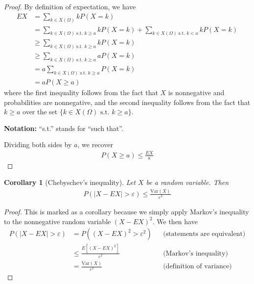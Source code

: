 \documentclass[11pt,letterpaper]{article}
\newcommand\eps{\varepsilon}
\newcommand\var{\text{Var}}
\numberwithin{theorem}{section}
\numberwithin{definition}{section}
\numberwithin{lemma}{section}
\newtheorem{corollary}[theorem]{Corollary}
\numberwithin{corollary}{section}
\numberwithin{proposition}{section}
\theoremstyle{definition}
\numberwithin{remark}{section}
\numberwithin{claim}{section}
\numberwithin{observation}{section}
\numberwithin{fact}{section}
\numberwithin{assumption}{section}
\numberwithin{example}{section}
\numberwithin{exercise}{section}
\begin{document}
\begin{proof}
By definition of expectation, we have
\begin{align*}
EX &= \sum_{k \in X(\Omega)} k P(X = k) \\
&= \sum_{k \in X(\Omega)\text{ s.t. } k \geq a} k P(X = k) + \sum_{k \in X(\Omega)\text{ s.t. } k < a} k P(X = k) \\
&\geq \sum_{k \in X(\Omega)\text{ s.t. } k \geq a} k P(X = k) \\
&\geq \sum_{k \in X(\Omega)\text{ s.t. } k \geq a} a P(X = k) \\ 
&= a \sum_{k \in X(\Omega)\text{ s.t. } k \geq a}  P(X = k) \\ 
&= a P(X \geq a)
\end{align*}
where the first inequality follows from the fact that $X$ is nonnegative and probabilities are nonnegative, and the second inequality follows from the fact that $k \geq a$ over the set $\{k \in X(\Omega) \text{ s.t. } k \geq a\}$.

\textbf{Notation:} ``s.t.'' stands for ``such that''.

Dividing both sides by $a$, we recover
\begin{align*}
P(X \geq a) \leq \frac{EX}{a}
\end{align*}
\end{proof}

\begin{corollary}[Chebyschev's inequality]
Let $X$ be a random variable. Then
\begin{align*}
P(|X - EX| > \eps) \leq \frac{\var(X)}{\eps^2}
\end{align*}
\end{corollary}

\begin{proof}
This is marked as a corollary because we simply apply Markov's inequality to the nonnegative random variable $(X - EX)^2$. We then have
\begin{align*}
P(|X - EX| > \eps) &= P((X-EX)^2 > \eps^2) &&\text{(statements are equivalent)}\\
&\leq \frac{E[(X-EX)^2]}{\eps^2} &&\text{(Markov's inequality)} \\
&= \frac{\var(X)}{\eps^2} &&\text{(definition of variance)}
\end{align*}
\end{proof}


\newpage
\end{document}
